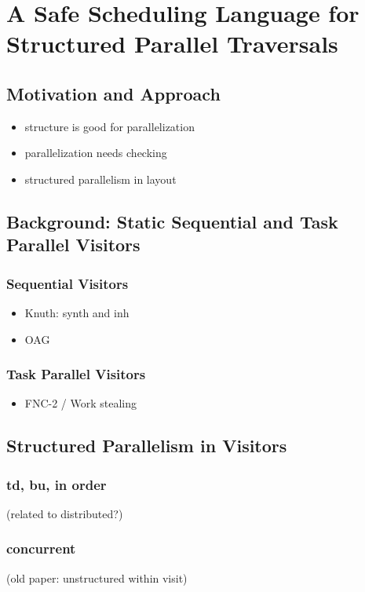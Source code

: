 \chapter{A Safe Scheduling Language for Structured Parallel Traversals}
\label{chap:3}

\section{Motivation and Approach}
\begin{itemize}
\item structure is good for parallelization
\item parallelization needs checking
\item structured parallelism in layout 
\end{itemize}



\section{Background:  Static Sequential and Task Parallel Visitors}
\subsection{Sequential Visitors}  
\begin{itemize}
\item Knuth: synth and inh
\item OAG
\end{itemize}
\subsection{Task Parallel Visitors} 
\begin{itemize}
\item FNC-2 / Work stealing
\end{itemize}

\section{Structured Parallelism in Visitors} 
\subsection{td, bu, in order} (related to distributed?)
\subsection{concurrent} (old paper: unstructured within visit)
